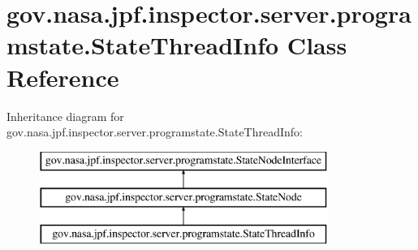 \hypertarget{classgov_1_1nasa_1_1jpf_1_1inspector_1_1server_1_1programstate_1_1_state_thread_info}{}\section{gov.\+nasa.\+jpf.\+inspector.\+server.\+programstate.\+State\+Thread\+Info Class Reference}
\label{classgov_1_1nasa_1_1jpf_1_1inspector_1_1server_1_1programstate_1_1_state_thread_info}
Inheritance diagram for gov.\+nasa.\+jpf.\+inspector.\+server.\+programstate.\+State\+Thread\+Info\+:\begin{figure}[H]
\begin{center}
\leavevmode
\includegraphics[height=3.000000cm]{classgov_1_1nasa_1_1jpf_1_1inspector_1_1server_1_1programstate_1_1_state_thread_info}
\end{center}
\end{figure}
